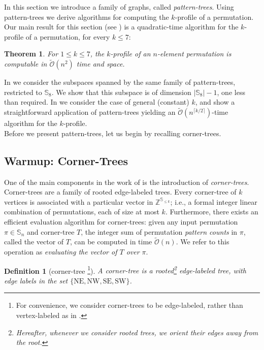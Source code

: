 \documentclass{article}
\newtheorem{definition}[theorem]{Definition}
\newcommand{\Sn}{\mathbb{S}_n}
\newcommand{\ZZ}{\mathbb{Z}}
\theoremstyle{remark}
\newcommand{\Otilde}[1]{\widetilde{\mathcal{O}}\left( #1 \right)}
\theoremstyle{plain}
\newtheorem{thm}{Theorem}
\begin{document}
In this section we introduce a family of graphs, called \textit{pattern-trees}.
Using pattern-trees we derive algorithms for computing the $k$-profile of a permutation.
Our main result for this section (see ) is
a quadratic-time algorithm for the $k$-profile of a permutation, for every $k \le 7$:
\begin{thm}
    \label{thm:fast_le_7_profile}
    For $1 \le k \le 7$, the $k$-profile of an $n$-element permutation is computable in $\Otilde{n^2}$ time and space.
\end{thm}

In  we consider the subspaces spanned by the same family of pattern-trees, restricted to $\mathbb{S}_8$.
We show that this subspace is of dimension $|\mathbb{S}_8| - 1$, one less than required.
In  we consider the case of general (constant) $k$, and show a straightforward 
application of pattern-trees yielding an $\widetilde{\mathcal{O}}(n^{\lceil k/2 \rceil})$-time algorithm
for the $k$-profile.\ \\


Before we present pattern-trees, let us begin by recalling corner-trees.

\subsection{Warmup: Corner-Trees}

One of the main components in the work of \cite{even2021counting} is the introduction of \emph{corner-trees}.
Corner-trees are a family of rooted edge-labeled trees. 
Every corner-tree of $k$ vertices is associated with a particular vector in $\ZZ^{\mathbb{S}_{\le k}}$;
i.e., a formal integer linear combination of permutations, each of size at most $k$.
Furthermore, there exists an efficient evaluation algorithm for corner-trees:
given any input permutation $\pi \in \Sn$ and corner-tree $T$,
the integer sum of permutation \textit{pattern counts} in $\pi$, called the vector of $T$,
can be computed in time $\Otilde{n}$. We refer to this operation
as \emph{evaluating the vector of $T$ over $\pi$}.

\begin{definition}[corner-tree \cite{even2021counting}\footnote{For convenience, we consider corner-trees to be edge-labeled, rather than vertex-labeled as in \cite{even2021counting}.}]
A corner-tree is a rooted\footnote{Hereafter, whenever we consider rooted trees, we orient their edges away from the root.} edge-labeled tree, with edge labels in the set $\{\mathrm{NE}, \mathrm{NW}, \mathrm{SE}, \mathrm{SW}\}$.
\end{definition}
\end{document}
